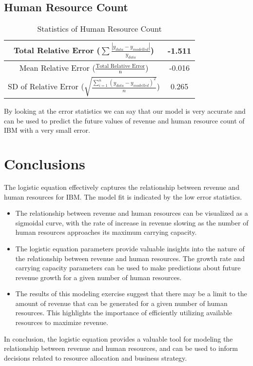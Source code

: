 \documentclass[aps,twocolumn,10pt,reprint]{revtex4}
\begin{document}
\subsection{Human Resource Count}
\renewcommand{\arraystretch}{2.5}
\begin{table}[!h]
\centering
\begin{tabular}{|c | c|}
\hline
Total Relative Error ($\sum \frac{|y_{data} - y_{modelled}|}{y_{data}}$) & -1.511 \\
\hline
Mean Relative Error ($\frac{\text{Total Relative Error}}{\text{n}}$) & -0.016 \\
\hline
SD of Relative Error ($\sqrt{\frac{\sum_{i=1}^{n} (y_{data} - y_{modelled})^2}{n}}$) & 0.265 \\
\hline
\end{tabular}
\caption{Statistics of Human Resource Count}
\label{table:statistics}
\end{table}



By looking at the error statistics we can say that our model is very accurate and can be used to predict the future values of revenue and human resource count of IBM with a very small error. 

\section{Conclusions}

The logistic equation effectively captures the relationship between revenue and human resources for IBM. The model fit is indicated by the low error statistics.

\begin{itemize}

\item The relationship between revenue and human resources can be visualized as a sigmoidal curve, with the rate of increase in revenue slowing as the number of human resources approaches its maximum carrying capacity.
\\
\item The logistic equation parameters provide valuable insights into the nature of the relationship between revenue and human resources. The growth rate and carrying capacity parameters can be used to make predictions about future revenue growth for a given number of human resources.
\\
\item The results of this modeling exercise suggest that there may be a limit to the amount of revenue that can be generated for a given number of human resources. This highlights the importance of efficiently utilizing available resources to maximize revenue.

\end{itemize}
In conclusion, the logistic equation provides a valuable tool for modeling the relationship between revenue and human resources, and can be used to inform decisions related to resource allocation and business strategy.
\end{document}
